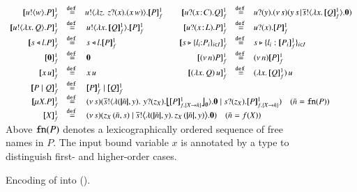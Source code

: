 \begin{figure}[t!]
\\
$
\begin{array}{rclcrcl}
	\pmapp{\bout{u}{w} P}{1}{f}	&\defeq&	\!\bout{u}{ \abs{z}{\,\binp{z}{x} (\appl{x}{w})} } \pmapp{P}{1}{f}
	&&
	\pmapp{\binp{u}{\AT{x}{C}} Q}{1}{f}	&\defeq&	\!\binp{u}{y} \newsp{s}{\appl{y}{s} \!\Par\! \bout{\dual{s}}{\abs{x}{\pmapp{Q}{1}{f}}} \inact}
	\\[1mm]

	\pmapp{\bout{u}{\abs{{x}}{Q}} P}{1}{f}  &\defeq& \bout{u}{\abs{{x}}{\pmapp{Q}{1}{f}}} \pmapp{P}{1}{f}
	&&
	\pmapp{\binp{u}{\AT{x}{L}} P}{1}{f} &\defeq& \!\binp{u}{x} \pmapp{P}{1}{f}
	\\[1mm]

	\pmapp{\bsel{s}{l} P}{1}{f} &\defeq& \bsel{s}{l} \pmapp{P}{1}{f}
	&&
	\pmapp{\bbra{s}{l_i{:}P_i}_{i \in I}}{1}{f} &\defeq& \!\bbra{s}{l_i: \pmapp{P_i}{1}{f}}_{i \in I}
	\\[1mm]

	\pmapp{\inact}{1}{f} &\defeq& \inact
	&&
	\pmapp{\news{n} P}{1}{f} &\defeq& \!\news{n} \pmapp{P}{1}{f}
	\\[1mm]

	\pmapp{{x}\, {u}}{1}{f} &\defeq& \appl{x}{u}
	& &
	\pmapp{\appl{(\abs{x}{Q})}{u}}{1}{f} &\defeq& \!\appl{(\abs{x}{\pmapp{Q}{1}{f}})}{u}
	\\[1mm]

	\pmapp{P \Par Q}{1}{f} & \!\!\defeq\!\! &\pmapp{P}{1}{f} \Par \pmapp{Q}{1}{f}
	\\
	\pmapp{\recp{X}{P}}{1}{f} &\defeq& 
	\multicolumn{5}{l}{
		\newsp{s}{\bout{\dual{s}}{\abs{(\vmap{\tilde{n}}, y)} \,{\binp{y}{z_\X} \auxmapp{\pmapp{P}{1}{{f,\{\rvar{X}\to \tilde{n}\}}}}{{}}{\es}}} \inact \Par  \binp{s}{z_\X} \pmapp{P}{1}{{f,\{\rvar{X}\to \tilde{n}\}}}}
	\quad
	(\tilde{n} = \fn{P})
	}
	\\ 
	\pmapp{\rvar{X}}{1}{f} & \defeq &
	\multicolumn{5}{l}{
		\newsp{s}{\appl{z_X}{(\tilde{n}, s)} \Par \bbout{\dual{s}}{ \abs{(\vmap{\tilde{n}},y)}{\appl{z_X}{(\vmap{\tilde{n}}, y)}}} \inact}  \quad (\tilde{n} = f(\rvar{X}))
	}
\end{array}
$
\\[1mm]
%
Above $\fn{P}$ denotes a lexicographically ordered sequence  of free names in $P$.
The input bound variable $x$ is annotated by a type to distinguish first- and higher-order cases.
\caption{\label{f:enc:hopi_to_ho}Encoding of \HOp into \HO ().}
\end{figure}

